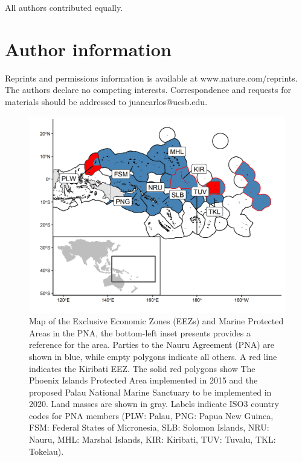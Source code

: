 \documentclass[12pt]{article}
\begin{document}
All authors contributed equally.

\section{Author information}

Reprints and permissions information is available at www.nature.com/reprints. The authors declare no competing interests. Correspondence and requests for materials should be addressed to juancarlos@ucsb.edu.

\clearpage

\FloatBarrier

\begin{figure}
\centering
\includegraphics{img/PNA_map.png}
\caption{\label{fig:PNA_map}Map of the Exclusive Economic Zones (EEZs) and Marine Protected Areas in the PNA, the bottom-left inset presents provides a reference for the area. Parties to the Nauru Agreement (PNA) are shown in blue, while empty polygons indicate all others. A red line indicates the Kiribati EEZ. The solid red polygons show The Phoenix Islands Protected Area implemented in 2015 and the proposed Palau National Marine Sanctuary to be implemented in 2020. Land masses are shown in gray. Labels indicate ISO3 country codes for PNA members (PLW: Palau, PNG: Papua New Guinea, FSM: Federal States of Micronesia, SLB: Solomon Islands, NRU: Nauru, MHL: Marshal Islands, KIR: Kiribati, TUV: Tuvalu, TKL: Tokelau).}
\end{figure}
\end{document}

